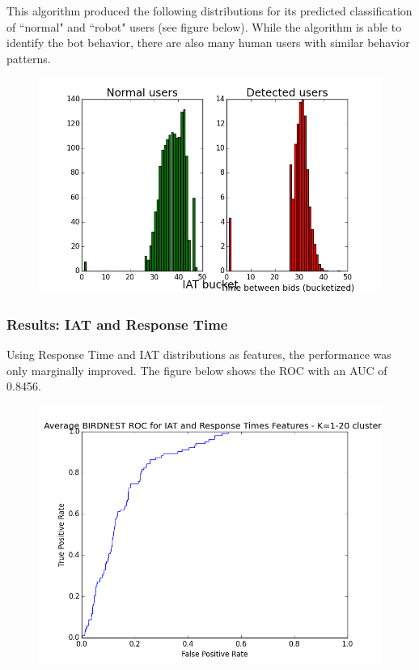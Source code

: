 \documentclass{article} %
\begin{document}
This algorithm produced the following distributions for its predicted classification of ``normal" and ``robot" users (see figure below).
While the algorithm is able to identify the bot behavior, there are also many human users with similar behavior patterns.

\begin{figure}[h]
\centering
{\includegraphics[scale=0.5]{img/bird_iat_pred.png}}
\end{figure}

\subsubsection{Results: IAT and Response Time}

Using Response Time and IAT distributions as features, the performance was only marginally improved.
The figure below shows the ROC with an AUC of 0.8456.

\clearpage

\begin{figure}[h]
\centering
{\includegraphics[scale=0.47]{img/bird_roc.png}}
\end{figure}
\end{document}
